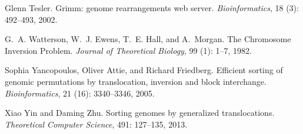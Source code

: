 \documentclass[utf8]{Frontiers_LaTex_Templates/frontiersFPHY} %
\numberwithin{equation}{section}
\begin{document}
\begin{thebibliography}{38}
Glenn Tesler.
\newblock Grimm: genome rearrangements web server.
\newblock \emph{Bioinformatics}, 18 (3): 492--493, 2002.

G.~A. Watterson, W.~J. Ewens, T.~E. Hall, and A.~Morgan.
\newblock The {C}hromosome {I}nversion {P}roblem.
\newblock \emph{Journal of Theoretical Biology}, 99 (1):
  1--7, 1982.

Sophia Yancopoulos, Oliver Attie, and Richard Friedberg.
\newblock Efficient sorting of genomic permutations by translocation, inversion
  and block interchange.
\newblock \emph{Bioinformatics}, 21 (16): 3340--3346, 2005.

Xiao Yin and Daming Zhu.
\newblock Sorting genomes by generalized translocations.
\newblock \emph{Theoretical Computer Science}, 491: 127--135, 2013.

\end{thebibliography}
\end{document}
